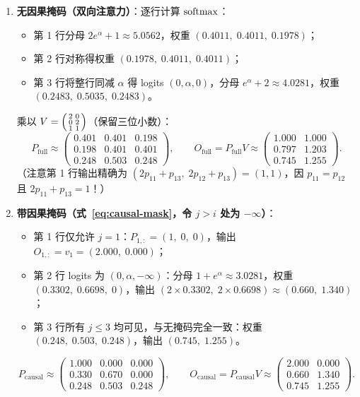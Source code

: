 \begin{enumerate}[label=(\arabic*), leftmargin=1.8em]
  \item \textbf{无因果掩码（双向注意力）}：逐行计算 $\operatorname{softmax}$：
  \begin{itemize}
    \item 第 1 行分母 $2 e^{\alpha} + 1 \approx 5.0562$，权重 $(0.4011,\; 0.4011,\; 0.1978)$；
    \item 第 2 行对称得权重 $(0.1978,\; 0.4011,\; 0.4011)$；
    \item 第 3 行将整行同减 $\alpha$ 得 logits $(0, \alpha, 0)$，分母 $e^{\alpha} + 2 \approx 4.0281$，权重 $(0.2483,\; 0.5035,\; 0.2483)$。
  \end{itemize}
  乘以 $V = \begin{psmallmatrix} 2 & 0 \\ 0 & 2 \\ 1 & 1 \end{psmallmatrix}$（保留三位小数）：
  \[
    P_{\text{full}} \approx \begin{pmatrix}
      0.401 & 0.401 & 0.198 \\
      0.198 & 0.401 & 0.401 \\
      0.248 & 0.503 & 0.248
    \end{pmatrix}, \qquad
    O_{\text{full}} = P_{\text{full}} V \approx \begin{pmatrix}
      1.000 & 1.000 \\
      0.797 & 1.203 \\
      0.745 & 1.255
    \end{pmatrix}.
  \]
  （注意第 1 行输出精确为 $(2p_{11}+p_{13},\; 2p_{12}+p_{13}) = (1, 1)$，因 $p_{11}=p_{12}$ 且 $2p_{11}+p_{13}=1$！）

  \item \textbf{带因果掩码（式~\eqref{eq:causal-mask}，令 $j > i$ 处为 $-\infty$）}：
  \begin{itemize}
    \item 第 1 行仅允许 $j=1$：$P_{1,:} = (1,\; 0,\; 0)$，输出 $O_{1,:} = v_1 = (2.000,\; 0.000)$；
    \item 第 2 行 logits 为 $(0, \alpha, -\infty)$：分母 $1 + e^{\alpha} \approx 3.0281$，权重 $(0.3302,\; 0.6698,\; 0)$，输出 $(2\times 0.3302,\; 2\times 0.6698) \approx (0.660,\; 1.340)$；
    \item 第 3 行所有 $j \le 3$ 均可见，与无掩码完全一致：权重 $(0.248,\; 0.503,\; 0.248)$，输出 $(0.745,\; 1.255)$。
  \end{itemize}
  \[
    P_{\text{causal}} \approx \begin{pmatrix}
      1.000 & 0.000 & 0.000 \\
      0.330 & 0.670 & 0.000 \\
      0.248 & 0.503 & 0.248
    \end{pmatrix}, \qquad
    O_{\text{causal}} = P_{\text{causal}} V \approx \begin{pmatrix}
      2.000 & 0.000 \\
      0.660 & 1.340 \\
      0.745 & 1.255
    \end{pmatrix}.
  \]
\end{enumerate}
